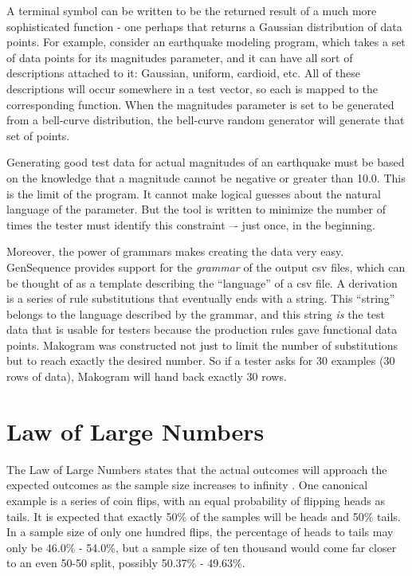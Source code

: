 A terminal symbol can be written to be the returned result of a much more sophisticated function - one perhaps that returns a Gaussian distribution of data points. For example, consider an earthquake modeling program, which takes a set of data points for its magnitudes parameter, and it can have all sort of descriptions attached to it: Gaussian, uniform, cardioid, etc. All of these descriptions will occur somewhere in a test vector, so each is mapped to the corresponding function. When the magnitudes parameter is set to be generated from a bell-curve distribution, the bell-curve random generator will generate that set of points.

Generating good test data for actual magnitudes of an earthquake must be based on the knowledge that a magnitude cannot be negative or greater than 10.0. This is the limit of the program. It cannot make logical guesses about the natural language of the parameter. But the tool is written to minimize the number of times the tester must identify this constraint –- just once, in the beginning.

Moreover, the power of grammars makes creating the data very easy. GenSequence provides support for the \textit{grammar} of the output csv files, which can be thought of as a template describing the ``language'' of a csv file. A derivation is a series of rule substitutions that eventually ends with a string. This ``string'' belongs to the language described by the grammar, and this string \textit{is} the test data that is usable for testers because the production rules gave functional data points. Makogram was constructed not just to limit the number of substitutions but to reach exactly the desired number. So if a tester asks for 30 examples (30 rows of data), Makogram will hand back exactly 30 rows.

\section{Law of Large Numbers}
The Law of Large Numbers states that the actual outcomes will approach the expected outcomes as the sample size increases to infinity . One canonical example is a series of coin flips, with an equal probability of flipping heads as tails. It is expected that exactly 50\% of the samples will be heads and 50\% tails. In a sample size of only one hundred flips, the percentage of heads to tails may only be 46.0\% - 54.0\%, but a sample size of ten thousand would come far closer to an even 50-50 split, possibly 50.37\% - 49.63\%. 

